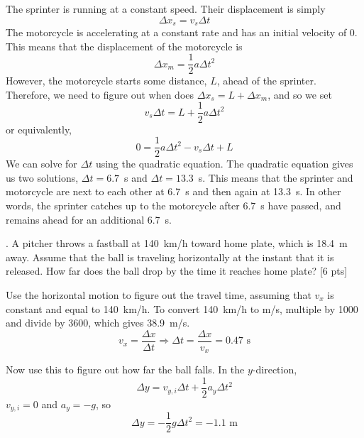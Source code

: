\documentclass[11pt,letterpaper]{article}
\newcommand{\sol}[1]{{\color{White} #1}} %
\begin{document}
\sol{The sprinter is running at a constant speed. Their displacement is simply
\begin{equation}
\Delta x_s = v_s\Delta{t}
\end{equation}
The motorcycle is accelerating at a constant rate and has an initial velocity of 0. This means that the displacement of the motorcycle is
\begin{equation}
\Delta x_m = \frac{1}{2}a\Delta t^2
\end{equation}
However, the motorcycle starts some distance, $L$, ahead of the sprinter. Therefore, we need to figure out when does $\Delta x_s = L+\Delta x_m$, and so we set
\begin{equation}
v_s\Delta t = L + \frac{1}{2}a\Delta t^2
\end{equation}
or equivalently,
\begin{equation}
0 = \frac{1}{2}a\Delta t^2 - v_s\Delta t + L
\end{equation}
We can solve for $\Delta t$ using the quadratic equation. The quadratic equation gives us two solutions, $\Delta t = 6.7$~s and $\Delta t=13.3$~s. This means that the sprinter and motorcycle are next to each other at 6.7~s and then again at 13.3~s. In other words, the sprinter catches up to the motorcycle after 6.7~s have passed, and remains ahead for an additional 6.7~s.


}

. A pitcher throws a fastball at 140~km/h toward home plate, which is 18.4~m away. Assume that the ball is traveling horizontally at the instant that it is released. How far does the ball drop by the time it reaches home plate? [6 pts]

\sol{Use the horizontal motion to figure out the travel time, assuming that $v_x$ is constant and equal to 140~km/h. To convert 140~km/h to m/s, multiple by 1000 and divide by 3600, which gives 38.9~m/s.
\begin{equation}
v_x = \frac{\Delta x}{\Delta t} \Rightarrow \Delta t = \frac{\Delta x}{v_x} = 0.47\mbox{ s}
\end{equation}

Now use this to figure out how far the ball falls. In the $y$-direction,
\begin{equation}
\Delta y = v_{y,i}\Delta t + \frac{1}{2}a_y\Delta t^2
\end{equation}
$v_{y,i}=0$ and $a_y=-g$, so
\begin{equation}
\Delta y = -\frac{1}{2}g\Delta t^2 = \boxed{-1.1\mbox{ m}}
\end{equation}


}
\end{document}
